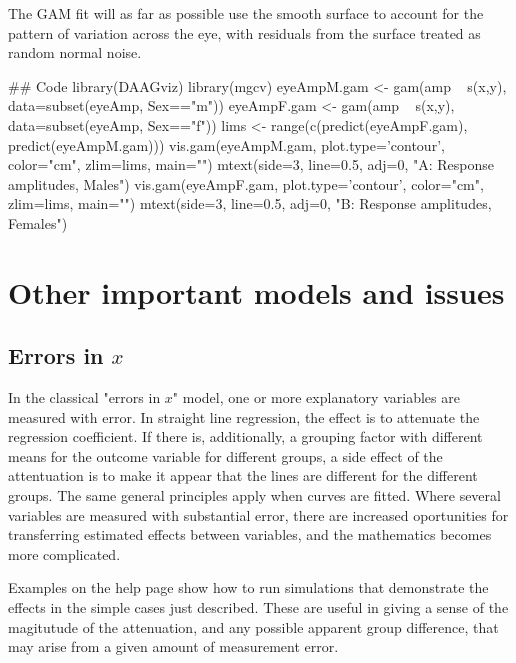 The GAM fit will as far as possible use the smooth surface
to account for the pattern of variation across the eye, with
residuals from the surface treated as random normal noise.
\vspace*{7pt}

\begin{fullwidth}

\begin{Schunk}
\begin{Sinput}
## Code
library(DAAGviz)
library(mgcv)
eyeAmpM.gam <- gam(amp ~ s(x,y), data=subset(eyeAmp, Sex=="m"))
eyeAmpF.gam <- gam(amp ~ s(x,y), data=subset(eyeAmp, Sex=="f"))
lims <- range(c(predict(eyeAmpF.gam), predict(eyeAmpM.gam)))
vis.gam(eyeAmpM.gam, plot.type='contour', color="cm", zlim=lims, main="")
mtext(side=3, line=0.5, adj=0, "A: Response amplitudes, Males")
vis.gam(eyeAmpF.gam, plot.type='contour', color="cm", zlim=lims, main="")
mtext(side=3, line=0.5, adj=0, "B: Response amplitudes, Females")
\end{Sinput}
\end{Schunk}

\end{fullwidth}

\section{Other important models and issues}

\subsection{Errors in $x$}
In the classical "errors in $x$" model, one or more explanatory variables
are measured with error.  In straight line regression, the effect is to
attenuate the regression coefficient.  If there is, additionally, a
grouping factor with different means for the outcome variable for different
groups, a side effect of the attentuation is to make it appear that the
lines are different for the different groups.  The same general principles
apply when curves are fitted.  Where several variables
are measured with substantial error, there are increased oportunities for
transferring estimated effects between variables, and the mathematics
becomes more complicated.

Examples on the help page  show how to run
simulations that demonstrate the effects in the simple cases just
described.  These are useful in giving a sense of the magitutude
of the attenuation, and any possible
apparent group difference, that may arise from a given amount of
measurement error.

